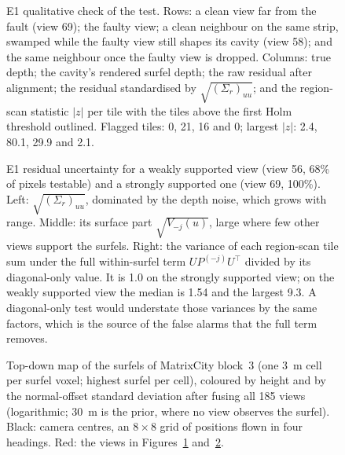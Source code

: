 \begin{figure}[!htbp]
\centering

\caption{E1 qualitative check of the test. Rows: a clean view far from the fault (view 69); the faulty
view; a clean neighbour on the same strip, swamped while the faulty view still shapes its cavity (view
58); and the same neighbour once the faulty view is dropped. Columns: true depth; the cavity's rendered
surfel depth; the raw residual after alignment; the residual standardised by $\sqrt{(\Sigma_r)_{uu}}$; and the
region-scan statistic $|z|$ per tile with the tiles above the first Holm threshold outlined. Flagged tiles:
0, 21, 16 and 0; largest $|z|$: 2.4, 80.1, 29.9 and 2.1.}
\label{fig:e1qualviews}
\end{figure}

\begin{figure}[!htbp]
\centering

\caption{E1 residual uncertainty for a weakly supported view (view 56, 68\% of pixels testable) and a
strongly supported one (view 69, 100\%). Left: $\sqrt{(\Sigma_r)_{uu}}$, dominated by the depth noise,
which grows with range. Middle: its surface part $\sqrt{V_{-j}(u)}$, large where few other views support
the surfels. Right: the variance of each region-scan tile sum under the full within-surfel term
$UP^{(-j)}U^{\top}$ divided by its diagonal-only value. It is 1.0 on the strongly supported view; on the weakly
supported view the median is 1.54 and the largest 9.3. A diagonal-only test would understate those variances
by the same factors, which is the source of the false alarms that the full term removes.}
\label{fig:e1qualunc}
\end{figure}

\begin{figure}[!htbp]
\centering

\caption{Top-down map of the surfels of MatrixCity block~3 (one 3~m cell per surfel voxel; highest surfel per
cell), coloured by height and by the normal-offset standard deviation after fusing all 185 views
(logarithmic; 30~m is the prior, where no view observes the surfel). Black: camera centres, an $8\times8$
grid of positions flown in four headings. Red: the views in Figures~\ref{fig:e1qualviews} and~\ref{fig:e1qualunc}.}
\label{fig:e1qualtop}
\end{figure}



